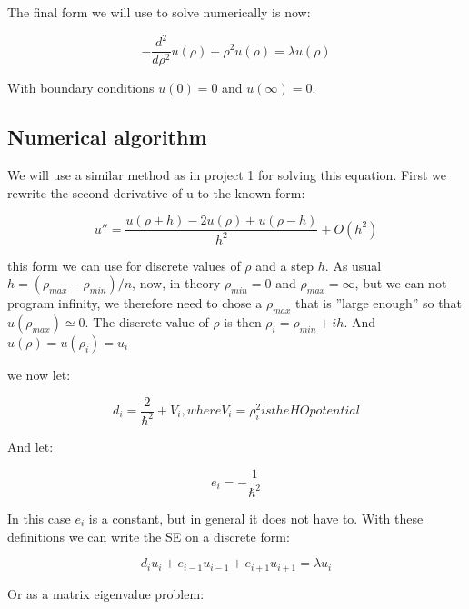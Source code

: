 \documentclass[norsk,a4paper,12pt]{article}
\begin{document}
The final form we will use to solve numerically is now:

\begin{equation}
 -\frac{d^2}{d\rho^2} u(\rho) + \rho^2u(\rho)  = \lambda u(\rho)
\end{equation}

With boundary conditions $u(0)=0$ and $u(\infty)=0$.


\subsection*{Numerical algorithm}

We will use a similar method as in project 1 for solving this equation. First we rewrite the second derivative of u
to the known form:

\begin{equation}
 u''=\frac{u(\rho+h) -2u(\rho) +u(\rho-h)}{h^2} +O(h^2)
\end{equation}

this form we can use for discrete values of $\rho$ and a step $h$. As usual $h = (\rho_{max} - \rho_{min})/n$, now, in theory 
$\rho_{min} = 0$ and $\rho_{max} = \infty$, but we can not program infinity, we therefore need to chose a $\rho_{max}$ that is ''large enough''
so that $u(\rho_{max}) \simeq 0$. The discrete value of $\rho$ is then $\rho_i = \rho_{min} + ih$. And $u(\rho) = u(\rho_i) = u_i$

we now let:

\begin{equation}
 d_i = \frac{2}{\hbar^2} + V_i, where V_i = \rho_i^2 is the HO potential
\end{equation}

And let:

\begin{equation}
 e_i = -\frac{1}{\hbar^2}
\end{equation}

In this case $e_i$ is a constant, but in general it does not have to. With these definitions we can write the SE on a discrete form:

\begin{equation}
 d_iu_i+e_{i-1}u_{i-1}+e_{i+1}u_{i+1}  = \lambda u_i
\end{equation}

Or as a matrix eigenvalue problem:
\end{document}
